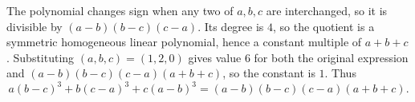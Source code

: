 The polynomial changes sign when any two of $a,b,c$ are interchanged, so it is divisible by $(a-b)(b-c)(c-a)$. Its degree is $4$, so the quotient is a symmetric homogeneous linear polynomial, hence a constant multiple of $a+b+c$. Substituting $(a,b,c)=(1,2,0)$ gives value $6$ for both the original expression and $(a-b)(b-c)(c-a)(a+b+c)$, so the constant is $1$. Thus
\[
\boxed{a(b-c)^3+b(c-a)^3+c(a-b)^3=(a-b)(b-c)(c-a)(a+b+c)}.
\]
